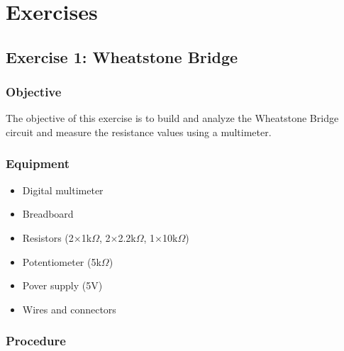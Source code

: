 \chapter{Exercises}

\section{Exercise 1: Wheatstone Bridge}

\subsection{Objective}
The objective of this exercise is to build and analyze the Wheatstone Bridge circuit and measure the resistance values using a multimeter.

\subsection{Equipment}

\begin{itemize}
    \item Digital multimeter
    \item Breadboard
    \item Resistors (2$\times$1k$\Omega$, 2$\times$2.2k$\Omega$, 1$\times$10k$\Omega$)
    \item Potentiometer (5k$\Omega$)
    \item Pover supply (5V)
    \item Wires and connectors
\end{itemize}

\newpage
\thispagestyle{plain}

\subsection{Procedure}

